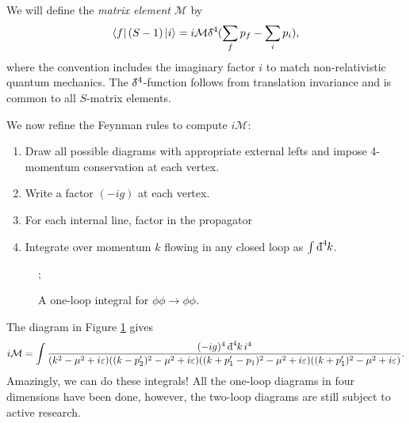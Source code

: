\begin{definition}[]
  We will define the \emph{matrix element} $\mathcal{M}$ by 
  \begin{equation}
    \bra{f} (S-1) \ket{i} = i \mathcal{M} \bdelta^4 (\sum_{f} p_f - \sum_{i} p_i),
  \end{equation}
  where the convention includes the imaginary factor $i$ to match non-relativistic quantum mechanics. The $\bdelta^4$-function follows from translation invariance and is common to all $S$-matrix elements.
\end{definition}

We now refine the Feynman rules to compute $i \mathcal{M}$:
\begin{enumerate}
  \item Draw all possible diagrams with appropriate external lefts and impose 4-momentum conservation at each vertex.
  \item Write a factor $(-ig)$ at each vertex.
  \item For each internal line, factor in the propagator
  \item Integrate over momentum $k$ flowing in any closed loop as $\int \bdd[4]{k}$.
\end{enumerate}

\begin{figure}[htbp]
  \centering
  ;
  \caption{A one-loop integral for $\phi \phi \to \phi \phi$.}
  \label{fig:abc}
\end{figure}

\begin{example}[$\phi \phi \to \phi \phi$]
  The diagram in Figure \ref{fig:abc} gives
  \begin{equation}
    i \mathcal{M} = \int \frac{(-ig)^4 \bdd[4]{k} i^4}{(k^2 - \mu^2 + i\varepsilon) ((k - p'_2)^2 - \mu^2 + i \varepsilon) ((k + p_1' - p_1)^2 - \mu^2 + i\varepsilon)((k+p_1')^2 - \mu^2 + i\varepsilon)}.
  \end{equation}
  Amazingly, we can do these integrals!
  All the one-loop diagrams in four dimensions have been done, however, the two-loop diagrams are still subject to active research.
\end{example}
